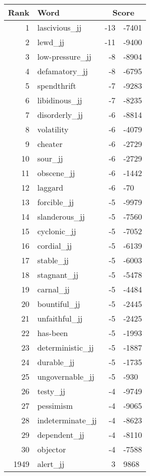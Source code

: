 \begin{longtable}[!htbp]{| rlr@{.}l |}
    \hline
    \textbf{Rank} & \textbf{Word} & \multicolumn{2}{c|}{\textbf{Score}} \\
    \hline
    \endhead
    1 & lascivious\_jj & -13 & -7401 \\
    2 & lewd\_jj & -11 & -9400 \\
    3 & low-pressure\_jj & -8 & -8904 \\
    4 & defamatory\_jj & -8 & -6795 \\
    5 & spendthrift & -7 & -9283 \\
    6 & libidinous\_jj & -7 & -8235 \\
    7 & disorderly\_jj & -6 & -8814 \\
    8 & volatility & -6 & -4079 \\
    9 & cheater & -6 & -2729 \\
    10 & sour\_jj & -6 & -2729 \\
    11 & obscene\_jj & -6 & -1442 \\
    12 & laggard & -6 & -70 \\
    13 & forcible\_jj & -5 & -9979 \\
    14 & slanderous\_jj & -5 & -7560 \\
    15 & cyclonic\_jj & -5 & -7052 \\
    16 & cordial\_jj & -5 & -6139 \\
    17 & stable\_jj & -5 & -6003 \\
    18 & stagnant\_jj & -5 & -5478 \\
    19 & carnal\_jj & -5 & -4484 \\
    20 & bountiful\_jj & -5 & -2445 \\
    21 & unfaithful\_jj & -5 & -2425 \\
    22 & has-been & -5 & -1993 \\
    23 & deterministic\_jj & -5 & -1887 \\
    24 & durable\_jj & -5 & -1735 \\
    25 & ungovernable\_jj & -5 & -930 \\
    26 & testy\_jj & -4 & -9749 \\
    27 & pessimism & -4 & -9065 \\
    28 & indeterminate\_jj & -4 & -8623 \\
    29 & dependent\_jj & -4 & -8110 \\
    30 & objector & -4 & -7588 \\
    1949 & alert\_jj & 3 & 9868 \\

\end{longtable}
